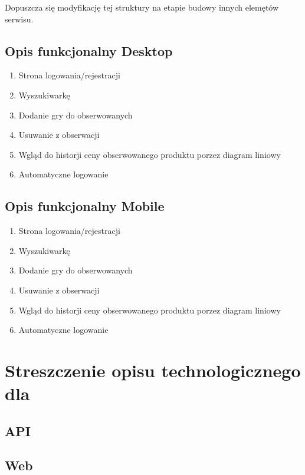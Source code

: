 \documentclass{article}
\begin{document}
        Dopuszcza się modyfikację tej struktury na etapie budowy innych elemętów serwisu.
        
    \subsection{Opis funkcjonalny Desktop}
    
        \begin{enumerate}
            \item Strona logowania/rejestracji
            \item Wyszukiwarkę
            \item Dodanie gry do obserwowanych
            \item Usuwanie z obserwacji
            \item Wgląd do historji ceny obserwowanego produktu porzez diagram liniowy
            \item Automatyczne logowanie
        \end{enumerate}
    \subsection{Opis funkcjonalny Mobile}
            \begin{enumerate}
            \item Strona logowania/rejestracji
            \item Wyszukiwarkę
            \item Dodanie gry do obserwowanych
            \item Usuwanie z obserwacji
            \item Wgląd do historji ceny obserwowanego produktu porzez diagram liniowy
            \item Automatyczne logowanie
        \end{enumerate}

\section{Streszczenie opisu technologicznego dla}
    \subsection{API}
       
        
    \subsection{Web}
        
\end{document}

